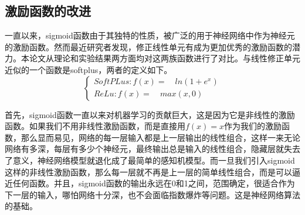 	\subsection{激励函数的改进}
		
		一直以来，sigmoid函数由于其独特的性质，被广泛的用于神经网络中作为神经元的激励函数。然而最近研究者发现，修正线性单元有成为更加优秀的激励函数的潜力。本论文从理论和实验结果两方面均对这两族函数进行了对比。与线性修正单元近似的一个函数是softplus，两者的定义如下。
		\begin{equation}
		\begin{cases}
		SoftPLus: f(x) = \quad ln(1 + e^x) \\
		ReLu:  f(x) = \quad max(x, 0)
		\end{cases}
		\end{equation}
		
		首先，sigmoid函数一直以来对机器学习的贡献巨大，这是因为它是非线性的激励函数。如果我们不用非线性激励函数，而是直接用$f(x) = x$作为我们的激励函数，那么显而易见，网络的每一层输入都是上一层输出的线性组合，这样一来无论网络有多深，每层有多少个神经元，最终输出总是输入的线性组合，隐藏层就失去了意义，神经网络模型就退化成了最简单的感知机模型。而一旦我们引入sigmoid这样的非线性激励函数，那么每一层就不再是上一层的简单线性组合，而是可以逼近任何函数。并且，sigmoid函数的输出永远在0和1之间，范围确定，很适合作为下一层的输入，哪怕网络十分深，也不会面临指数爆炸等问题。这是神经网络算法的基础。
		
